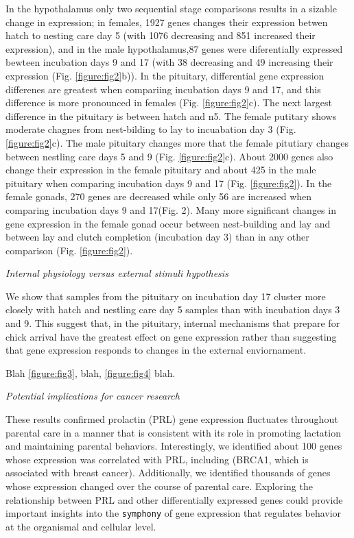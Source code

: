 In the hypothalamus only two sequential stage comparisons results in a
sizable change in expression; in females, 1927 genes changes their
expression betwen hatch to nesting care day 5 (with 1076 decreasing and
851 increased their expression), and in the male hypothalamus,87 genes
were diferentially expressed bewteen incubation days 9 and 17 (with 38
decreasing and 49 increasing their expression (Fig.
\ref{figure:fig2}b)). In the pituitary, differential gene expression
differenes are greatest when compariing incubation days 9 and 17, and
this difference is more pronounced in females (Fig. \ref{figure:fig2}c).
The next largest difference in the pituitary is between hatch and n5.
The female putitary shows moderate chagnes from nest-bilding to lay to
incuabation day 3 (Fig. \ref{figure:fig2}c). The male pituitary changes
more that the female pitutiary changes between nestling care days 5 and
9 (Fig. \ref{figure:fig2}c). About 2000 genes also change their
expression in the female pituitary and about 425 in the male pituitary
when comparing incubation days 9 and 17 (Fig. \ref{figure:fig2}). In the
female gonads, 270 genes are decreased while only 56 are increased when
comparing incubation days 9 and 17(Fig. 2). Many more significant
changes in gene expression in the female gonad occur between
nest-building and lay and between lay and clutch completion (incubation
day 3) than in any other comparison (Fig. \ref{figure:fig2}).

\emph{Internal physiology versus external stimuli hypothesis}

We show that samples from the pituitary on incubation day 17 cluster
more closely with hatch and nestling care day 5 samples than with
incubation days 3 and 9. This suggest that, in the pituitary, internal
mechanisms that prepare for chick arrival have the greatest effect on
gene expression rather than suggesting that gene expression responds to
changes in the external enviornament.

Blah \ref{figure:fig3}, blah, \ref{figure:fig4} blah.

\emph{Potential implications for cancer research}

These results confirmed prolactin (PRL) gene expression fluctuates
throughout parental care in a manner that is consistent with its role in
promoting lactation and maintaining parental behaviors. Interestingly,
we identified about 100 genes whose expression was correlated with PRL,
including (BRCA1, which is associated with breast cancer). Additionally,
we identified thousands of genes whose expression changed over the
course of parental care. Exploring the relationship between PRL and
other differentially expressed genes could provide important insights
into the \texttt{symphony} of gene expression that regulates behavior at
the organismal and cellular level.

